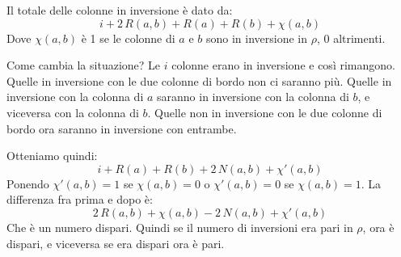 Il totale delle colonne in inversione \`e dato da:
\[
	i + 2 \, R(a,b) + R(a) + R(b) + \chi (a,b)
\]
Dove $\chi (a,b)$ \`e 1 se le colonne di $a$ e $b$ sono in inversione in $\rho$, 0 altrimenti.

Come cambia la situazione?
Le $i$ colonne erano in inversione e cos\`i rimangono. Quelle in inversione con le due colonne di bordo non ci saranno pi\`u.
Quelle in inversione con la colonna di $a$ saranno in inversione con la colonna di $b$, e viceversa con la colonna di $b$.
Quelle non in inversione con le due colonne di bordo ora saranno in inversione con entrambe.

Otteniamo quindi:
\[
	i + R(a) + R(b) + 2 \, N(a,b) + \chi'(a,b)
\]
Ponendo $\chi'(a,b) = 1$ se $\chi (a,b) = 0$ o $\chi'(a,b) = 0$ se $\chi(a,b) = 1$.
La differenza fra prima e dopo \`e:
\[
	2 \, R(a,b) + \chi (a,b) - 2 \, N(a,b) + \chi'(a,b)
\]
Che \`e un numero dispari.
Quindi se il numero di inversioni era pari in $\rho$, ora \`e dispari, e viceversa se era dispari ora \`e pari.











